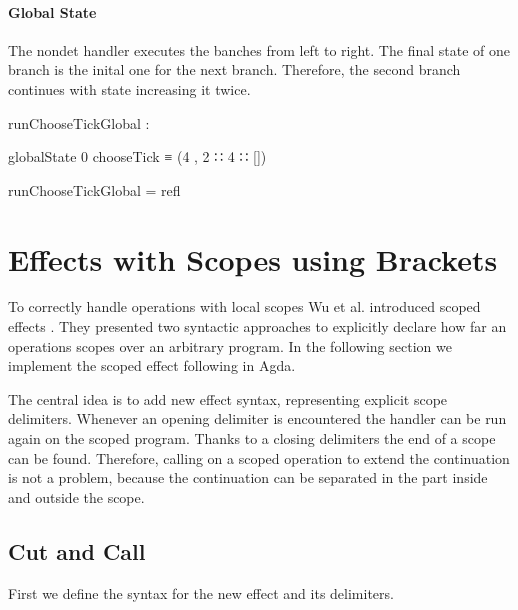 \paragraph{Global State}
The nondet handler executes the banches from left to right.
The final state of one branch is the inital one for the next branch.
Therefore, the second branch continues with state  increasing it
twice.

\begin{center}
\begin{code}
runChooseTickGlobal :
\end{code}
\begin{code}[inline]
 globalState 0 chooseTick ≡ (4 , 2 ∷ 4 ∷ [])
\end{code}
\begin{code}
runChooseTickGlobal = refl
\end{code}
\end{center}


\section{Effects with Scopes using Brackets}

To correctly handle operations with local scopes Wu et al. introduced scoped
effects \cite{DBLP:conf/haskell/WuSH14}.
They presented two syntactic approaches to explicitly declare how far an
operations scopes over an arbitrary program.
In the following section we implement the scoped effect
 following \cite{DBLP:conf/haskell/WuSH14} in Agda.

The central idea is to add new effect syntax, representing explicit scope
delimiters.
Whenever an opening delimiter is encountered the handler can be run again on the
scoped program.
Thanks to a closing delimiters the end of a scope can be found.
Therefore, calling \AgdaFunction{>>=} on a scoped operation to extend the
continuation is not a problem, because the continuation can be separated in the
part inside and outside the scope.


\subsection{Cut and Call}

First we define the syntax for the new effect and its delimiters.

